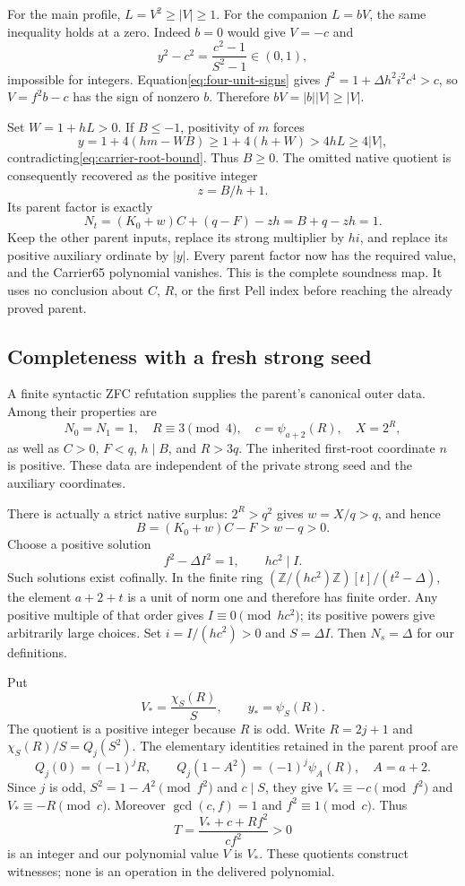 For the main profile, $L=V^2\ge|V|\ge1$.  For the companion
$L=bV$, the same inequality holds at a zero.  Indeed $b=0$ would give
$V=-c$ and
\[
 y^2-c^2=\frac{c^2-1}{S^2-1}\in(0,1),
\]
impossible for integers.  Equation\eqref{eq:four-unit-signs} gives
$f^2=1+\Delta h^2i^2c^4>c$, so $V=f^2b-c$ has the sign of nonzero
$b$.  Therefore $bV=|b||V|\ge|V|$.

Set $W=1+hL>0$.  If $B\le-1$, positivity of $m$ forces
\[
 y=1+4(hm-WB)\ge1+4(h+W)>4hL\ge4|V|,
\]
contradicting\eqref{eq:carrier-root-bound}.  Thus $B\ge0$.
The omitted native quotient is consequently recovered as the positive
integer
\[
 z=B/h+1.
\]
Its parent factor is exactly
\[
 N_t=(K_0+w)C+(q-F)-zh=B+q-zh=1.
\]
Keep the other parent inputs, replace its strong multiplier by $hi$,
and replace its positive auxiliary ordinate by $|y|$.  Every parent
factor now has the required value, and the Carrier65 polynomial vanishes.
This is the complete soundness map.  It uses no conclusion about $C$,
$R$, or the first Pell index before reaching the already proved parent.

\subsection{Completeness with a fresh strong seed}

A finite syntactic ZFC refutation supplies the parent's canonical outer
data.  Among their properties are
\[
 N_0=N_1=1,\quad R\equiv3\pmod4,\quad
 c=\psi_{a+2}(R),\quad X=2^R,
\]
as well as $C>0$, $F<q$, $h\mid B$, and $R>3q$.  The inherited
first-root coordinate $n$ is positive.  These data are independent of
the private strong seed and the auxiliary coordinates.

There is actually a strict native surplus: $2^R>q^2$ gives $w=X/q>q$,
and hence
\begin{equation}
 B=(K_0+w)C-F>w-q>0.\label{eq:strict-native-surplus}
\end{equation}
Choose a positive solution
\[
 f^2-\Delta I^2=1,\qquad hc^2\mid I.
\]
Such solutions exist cofinally.  In the finite ring
$(\mathbb Z/(hc^2)\mathbb Z)[t]/(t^2-\Delta)$, the element $a+2+t$
is a unit of norm one and therefore has finite order.  Any positive
multiple of that order gives $I\equiv0\pmod{hc^2}$; its positive
powers give arbitrarily large choices.  Set $i=I/(hc^2)>0$ and
$S=\Delta I$.  Then $N_s=\Delta$ for our definitions.

Put
\[
 V_*=\frac{\chi_S(R)}{S},\qquad y_* =\psi_S(R).
\]
The quotient is a positive integer because $R$ is odd.  Write $R=2j+1$
and $\chi_S(R)/S=Q_j(S^2)$.  The elementary identities retained in
the parent proof are
\[
 Q_j(0)=(-1)^jR,\qquad
 Q_j(1-A^2)=(-1)^j\psi_A(R),\quad A=a+2.
\]
Since $j$ is odd, $S^2=1-A^2\pmod{f^2}$ and $c\mid S$, they give
$V_*\equiv-c\pmod{f^2}$ and $V_*\equiv-R\pmod c$.
Moreover $\gcd(c,f)=1$ and $f^2\equiv1\pmod c$.  Thus
\[
 T=\frac{V_*+c+Rf^2}{cf^2}>0
\]
is an integer and our polynomial value $V$ is $V_*$.  These quotients
construct witnesses; none is an operation in the delivered polynomial.

